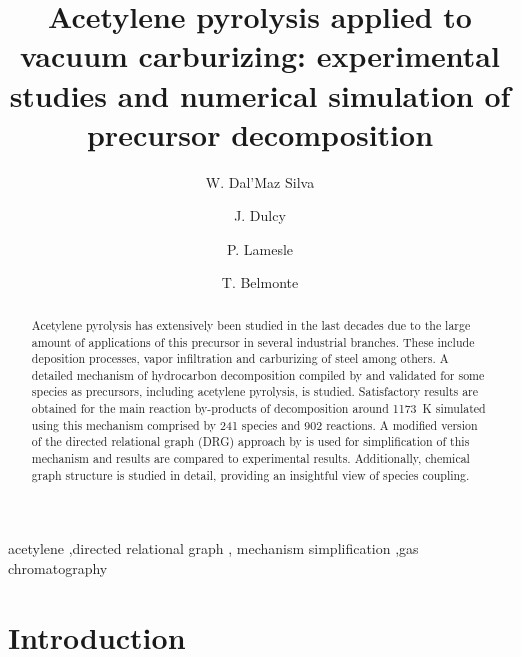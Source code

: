 \documentclass[final,3p,times,twocolumn,sort&compress]{elsarticle}
\begin{document}
\begin{frontmatter}
	
	
	\title{Acetylene pyrolysis applied to vacuum carburizing: experimental studies and numerical simulation of precursor decomposition}
	
	\author[ijl,irt]{W. Dal'Maz Silva}
	
	\author[ijl]{J. Dulcy} 
	
	\author[irt]{P. Lamesle}
	
	\author[ijl]{T. Belmonte} 
	
	
	\address[ijl]{Institut Jean Lamour, Parc de Saurupt, Nancy 54011, France}
	\address[irt]{Institut de Recherche Technologique M2P, Metz 57070, France}
	
	\begin{abstract}
		Acetylene pyrolysis has extensively been studied in the last decades due to the large amount of applications of this precursor in several industrial branches. These include deposition processes, vapor infiltration and carburizing of steel among others. A detailed mechanism of hydrocarbon decomposition compiled by \citet{Norinaga2009} and validated for some species as precursors, including acetylene pyrolysis, is studied. Satisfactory results are obtained for the main reaction by-products of  decomposition around \SI{1173}{\kelvin} simulated using this mechanism comprised by 241 species and 902 reactions. A modified version of the directed relational graph (DRG) approach by \citet{Lu2005} is used for simplification of this mechanism and results are compared to experimental results. Additionally, chemical graph structure is studied in detail, providing an insightful view of species coupling.
	\end{abstract}
	
	\begin{keyword} 
		acetylene \sep directed relational graph \sep 
		mechanism simplification \sep gas chromatography 
	\end{keyword} 
\end{frontmatter}

\section{Introduction}
\end{document}
